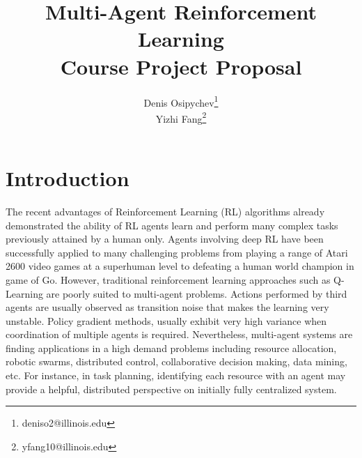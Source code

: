 \documentclass[12pt, letter]{article}
\title{Multi-Agent Reinforcement Learning\\
	\large{ Course Project Proposal}}
\author{
		Denis Osipychev\thanks{deniso2@illinois.edu} \\
		Yizhi Fang\thanks{yfang10@illinois.edu} \\
	}
\date{}
\begin{document}
\singlespacing
		
\maketitle
\newpage
		
		
\section{Introduction}
The recent advantages of Reinforcement Learning (RL) algorithms already demonstrated the ability of RL agents learn and perform many complex tasks previously attained by a human only. Agents involving deep RL have been successfully applied to many challenging problems from playing a range of Atari 2600 video games at a superhuman level to defeating a human world champion in game of Go. However, traditional reinforcement learning approaches such as Q-Learning are poorly suited to multi-agent problems. Actions performed by third agents are usually observed as transition noise that makes the learning very unstable\cite{nowe2012game}. Policy gradient methods, usually exhibit very high variance when coordination of multiple agents is required\cite{lowe2017}. Nevertheless, multi-agent systems are finding applications in a high demand problems including resource allocation, robotic swarms, distributed control, collaborative decision making, data mining, etc. For instance, in task planning, identifying each resource with an agent may provide a helpful, distributed perspective on initially fully centralized system.
		
\end{document}
